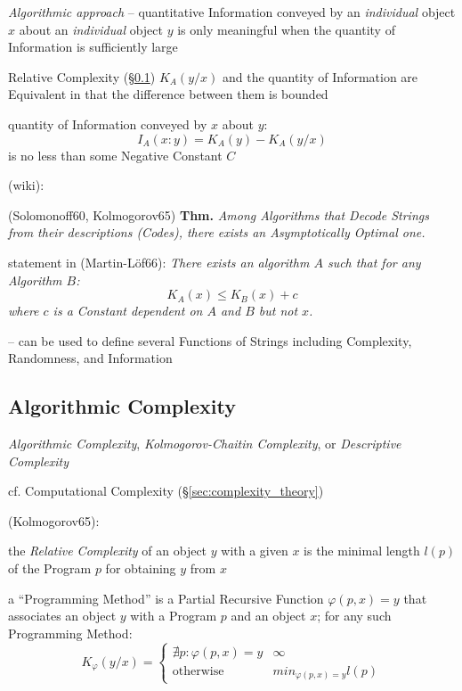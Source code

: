 \emph{Algorithmic approach} -- quantitative Information conveyed by an
\emph{individual} object $x$ about an \emph{individual} object $y$ is only
meaningful when the quantity of Information is sufficiently large

Relative Complexity (\S\ref{sec:algorithmic_complexity}) $K_A(y/x)$ and the
quantity of Information are Equivalent in that the difference between them is
bounded

quantity of Information conveyed by $x$ about $y$:
\[
  I_A(x:y) = K_A(y) - K_A(y/x)
\]
is no less than some Negative Constant $C$

(wiki):

(Solomonoff60, Kolmogorov65) \textbf{Thm.}
\emph{Among Algorithms that Decode Strings from their descriptions (Codes),
  there exists an Asymptotically Optimal one.}

statement in (Martin-L\"of66):
\emph{
  There exists an algorithm $A$ such that for any Algorithm $B$:
  \[
    K_A(x) \leq K_B(x) + c
  \]
  where $c$ is a Constant dependent on $A$ and $B$ but not $x$.
}

-- can be used to define several Functions of Strings including Complexity,
Randomness, and Information



\subsection{Algorithmic Complexity}\label{sec:algorithmic_complexity}

\emph{Algorithmic Complexity}, \emph{Kolmogorov-Chaitin Complexity}, or
\emph{Descriptive Complexity}

cf. Computational Complexity (\S\ref{sec:complexity_theory})

(Kolmogorov65):

the \emph{Relative Complexity} of an object $y$ with a given $x$
is the minimal length $l(p)$ of the Program $p$ for obtaining $y$ from $x$

a ``Programming Method'' is a Partial Recursive Function $\varphi(p, x) = y$
that associates an object $y$ with a Program $p$ and an object $x$; for any such
Programming Method:
\[
  K_\varphi(y/x) =
  \begin{cases}
    \nexists p : \varphi(p,x) = y & \infty \\
    \text{otherwise}              & min_{\varphi(p, x)=y} l(p)
  \end{cases}
\]

